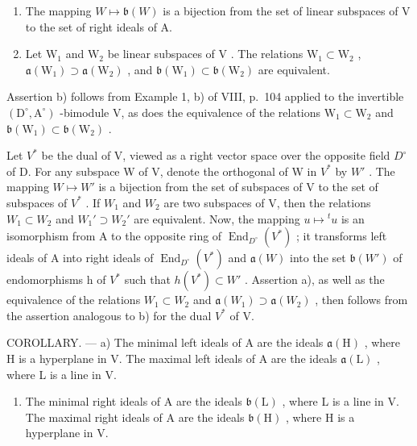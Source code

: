 \begin{enumerate}
\def\labelenumi{\alph{enumi})}
\setcounter{enumi}{1}
\item
  The mapping \(W \mapsto \mathfrak{b}(W)\) is a bijection from the set of linear subspaces of V to the set of right ideals of A.
\item
  Let \(\mathrm{W}_1\) and \(\mathrm{W}_2\) be linear subspaces of \(\mathrm{V}\) . The relations \(\mathrm{W}_1 \subset \mathrm{W}_2\) , \(\mathfrak{a}(\mathrm{W}_1) \supset \mathfrak{a}(\mathrm{W}_2)\) , and \(\mathfrak{b}(\mathrm{W}_1) \subset \mathfrak{b}(\mathrm{W}_2)\) are equivalent.
\end{enumerate}

Assertion b) follows from Example 1, b) of VIII, p.~104 applied to the invertible \((\mathrm{D}^{\circ},\mathrm{A}^{\circ})\) -bimodule V, as does the equivalence of the relations \(\mathrm{W}_1\subset \mathrm{W}_2\) and \(\mathfrak{b}(\mathrm{W}_1)\subset \mathfrak{b}(\mathrm{W}_2)\) .

Let \(V^{*}\) be the dual of V, viewed as a right vector space over the opposite field \(D^{\circ}\) of D. For any subspace W of V, denote the orthogonal of W in \(V^{*}\) by \(W'\) . The mapping \(W \mapsto W'\) is a bijection from the set of subspaces of V to the set of subspaces of \(V^{*}\) . If \(W_{1}\) and \(W_{2}\) are two subspaces of V, then the relations \(W_{1} \subset W_{2}\) and \(W_{1}' \supset W_{2}'\) are equivalent. Now, the mapping \(u \mapsto {}^{t}u\) is an isomorphism from A to the opposite ring of \(\operatorname{End}_{D^{\circ}}(V^{*})\) ; it transforms left ideals of A into right ideals of \(\operatorname{End}_{D^{\circ}}(V^{*})\) and \(\mathfrak{a}(W)\) into the set \(\mathfrak{b}(W')\) of endomorphisms h of \(V^{*}\) such that \(h(V^{*}) \subset W'\) . Assertion a), as well as the equivalence of the relations \(W_{1} \subset W_{2}\) and \(\mathfrak{a}(W_{1}) \supset \mathfrak{a}(W_{2})\) , then follows from the assertion analogous to b) for the dual \(V^{*}\) of V.

COROLLARY. --- a) The minimal left ideals of A are the ideals \(\mathfrak{a}(\mathrm{H})\) , where H is a hyperplane in V. The maximal left ideals of A are the ideals \(\mathfrak{a}(\mathrm{L})\) , where L is a line in V.

\begin{enumerate}
\def\labelenumi{\alph{enumi})}
\setcounter{enumi}{1}
\tightlist
\item
  The minimal right ideals of A are the ideals \(\mathfrak{b}(\mathrm{L})\) , where L is a line in V. The maximal right ideals of A are the ideals \(\mathfrak{b}(\mathrm{H})\) , where H is a hyperplane in V.
\end{enumerate}

